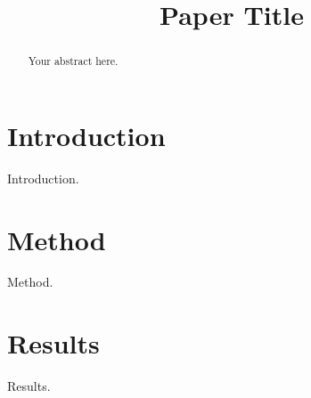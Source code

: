 \documentclass[conference]{IEEEtran}
\begin{document}
\title{Paper Title}

\author{
}

\maketitle

\begin{abstract}
Your abstract here.
\end{abstract}

\section{Introduction}
Introduction.

\section{Method}
Method.

\section{Results}
Results.



\end{document}
